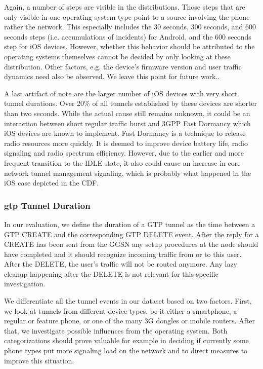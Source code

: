 Again, a number of steps are visible in the distributions. %
Those steps that are only visible in one operating system type point to a source involving the phone rather the network. This especially includes the 30 seconds, 300 seconds, and 600 seconds steps (i.e. accumulations of incidents) for Android, and the 600 seconds step for iOS devices. However, whether this behavior should be attributed to the operating systems themselves cannot be decided by only looking at these distribution. Other factors, e.g. the device's firmware version and user traffic dynamics need also be observed. We leave this point for future work..

A last artifact of note are the larger number of iOS devices with very short tunnel durations. Over 20\% of all tunnels established by these devices are shorter than two seconds. While the actual cause still remains unknown, it could be an interaction between short regular traffic burst and 3GPP Fast Dormancy \cite{gsma2011fdbestpract} which iOS devices are known to implement. Fast Dormancy is a technique to release radio resources more quickly. It is deemed to improve device battery life, radio signaling and radio spectrum efficiency. However, due to the earlier and more frequent transition to the IDLE state, it also could cause an increase in core network tunnel management signaling, which is probably what happened in the iOS case depicted in the CDF.


\subsubsection{\texorpdfstring{\acrshort{gtp}}{GTP} Tunnel Duration}

In our evaluation, we define the duration of a GTP tunnel as the time between a GTP CREATE and the corresponding GTP DELETE event. After the reply for a CREATE has been sent from the \gls{GGSN} any setup procedures at the node should have completed and it should recognize incoming traffic from or to this user. After the DELETE, the user's traffic will not be routed anymore. Any lazy cleanup happening after the DELETE is not relevant for this specific investigation.

We differentiate all the tunnel events in our dataset based on two factors. First, we look at tunnels from different device types, be it either a smartphone, a regular or feature phone, or one of the many 3G dongles or mobile routers. After that, we investigate possible influences from the operating system. Both categorizations should prove valuable for example in deciding if currently some phone types put more signaling load on the network and to direct measures to improve this situation.




